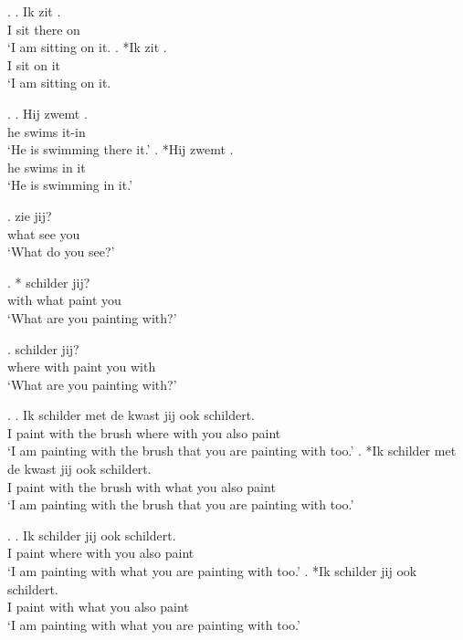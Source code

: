 \documentclass[xcolor=dvipsnames,10pt]{beamer}
\begin{document}
\begin{frame}

\ex.
\ag. Ik zit  .\\
 I sit there on\\
 `I am sitting on it.
\bg. *Ik zit  .\\
 I sit on it\\
 `I am sitting on it.

\ex.
 \ag. Hij zwemt  .\\
  he swims it-in\\
  `He is swimming there it.'
 \bg. *Hij zwemt  .\\
  he swims in it\\
  `He is swimming in it.'

\end{frame}



\begin{frame}

\exg.  zie jij?\\
 what see you\\
 `What do you see?'\label{ex:wat}

\exg. *  schilder jij?\\
 with what paint you\\
 `What are you painting with?'\label{ex:metwat}

\exg.   schilder jij?\\
 where with paint you with\\
 `What are you painting with?'\label{ex:waar-mee}

\end{frame}


\begin{frame}

\ex.\label{ex:headed}
\ag. Ik schilder met de kwast   jij ook schildert.\\
 I paint with the brush where with you also paint\\
 `I am painting with the brush that you are painting with too.'
\bg. *Ik schilder met de kwast   jij ook schildert.\\
 I paint with the brush with what you also paint\\
 `I am painting with the brush that you are painting with too.'

\ex.\label{ex:headless}
\ag. Ik schilder   jij ook schildert.\\
 I paint where with you also paint\\
 `I am painting with what you are painting with too.'
\bg. *Ik schilder   jij ook schildert.\\
 I paint with what you also paint\\
 `I am painting with what you are painting with too.'

\end{frame}
\end{document}
